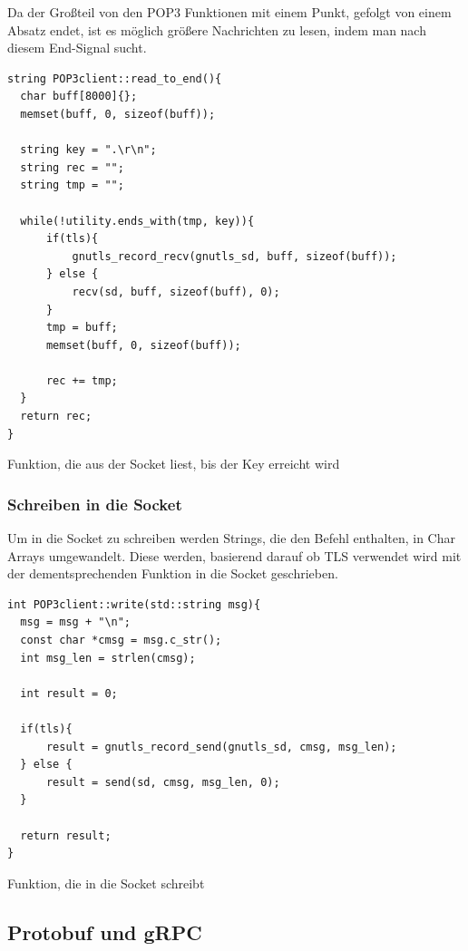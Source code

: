\documentclass[12pt, letterpaper]{article}
\newenvironment{code}{\captionsetup{type=listing}}{}
\begin{document}
Da der Großteil von den POP3 Funktionen mit einem Punkt, gefolgt von einem Absatz endet, ist es möglich größere Nachrichten zu lesen, indem man nach diesem End-Signal sucht.

\begin{code}
\begin{verbatim}
string POP3client::read_to_end(){
  char buff[8000]{};
  memset(buff, 0, sizeof(buff));

  string key = ".\r\n";
  string rec = "";
  string tmp = "";

  while(!utility.ends_with(tmp, key)){
      if(tls){
          gnutls_record_recv(gnutls_sd, buff, sizeof(buff));
      } else {
          recv(sd, buff, sizeof(buff), 0);
      }
      tmp = buff;
      memset(buff, 0, sizeof(buff));

      rec += tmp;
  }
  return rec;
}
\end{verbatim}
\caption{Funktion, die aus der Socket liest, bis der Key erreicht wird}
\label{create_gnutls}
\end{code}

\subsubsection{Schreiben in die Socket}

Um in die Socket zu schreiben werden Strings, die den Befehl enthalten, in Char Arrays umgewandelt. Diese werden, basierend darauf ob TLS verwendet wird mit der dementsprechenden Funktion in die Socket geschrieben.

\begin{code}
\begin{verbatim}
int POP3client::write(std::string msg){
  msg = msg + "\n";
  const char *cmsg = msg.c_str();
  int msg_len = strlen(cmsg);

  int result = 0;

  if(tls){
      result = gnutls_record_send(gnutls_sd, cmsg, msg_len);
  } else {
      result = send(sd, cmsg, msg_len, 0);
  }

  return result;
}
\end{verbatim}
\caption{Funktion, die in die Socket schreibt}
\label{create_gnutls}
\end{code}

\subsection{Protobuf und gRPC}
\end{document}
